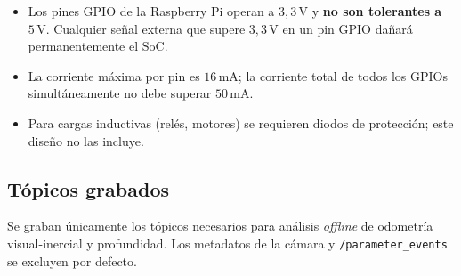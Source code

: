 \begin{itemize}
  \item Los pines GPIO de la Raspberry Pi operan a $3{,}3\,\mathrm{V}$
        y \textbf{no son tolerantes a $5\,\mathrm{V}$}. Cualquier señal
        externa que supere $3{,}3\,\mathrm{V}$ en un pin GPIO dañará
        permanentemente el SoC.
  \item La corriente máxima por pin es $16\,\mathrm{mA}$; la corriente
        total de todos los GPIOs simultáneamente no debe superar
        $50\,\mathrm{mA}$.
  \item Para cargas inductivas (relés, motores) se requieren diodos de
        protección; este diseño no las incluye.
\end{itemize}

\subsection{Tópicos grabados}
\label{sec:gpio-rosbag-topics}

Se graban únicamente los tópicos necesarios para análisis \emph{offline} de
odometría visual-inercial y profundidad. Los metadatos de la cámara y
\texttt{/parameter\_events} se excluyen por defecto.

